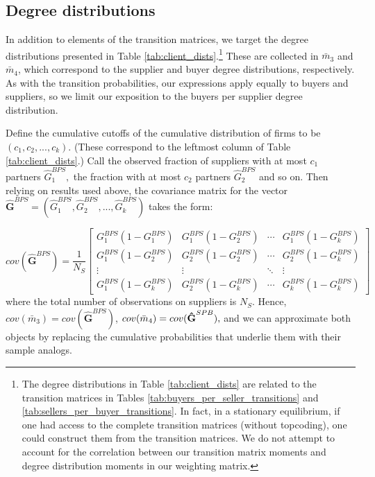 \documentclass[12pt]{article} \usepackage{amsmath,amssymb,amsthm,geometry,graphicx,setspace,algorithm,algpseudocode,float}
\begin{document}
\subsection{Degree distributions}

In addition to elements of the transition matrices, we target the degree
distributions presented in Table \ref{tab:client_dists}.\footnote{%
The degree distributions in Table \ref{tab:client_dists} are related to the
transition matrices in Tables \ref{tab:buyers_per_seller_transitions} and %
\ref{tab:sellers_per_buyer_transitions}. In fact, in a stationary
equilibrium, if one had access to the complete transition matrices (without
topcoding), one could construct them from the transition matrices. We do not
attempt to account for the correlation between our transition matrix moments
and degree distribution moments in our weighting matrix.} These are
collected in $\bar{m}_{3}$ and $\bar{m}_{4}$, which correspond to the supplier
and buyer degree distributions, respectively. As with the transition
probabilities, our expressions apply equally to buyers and suppliers, so we
limit our exposition to the buyers per supplier degree distribution.

Define the cumulative cutoffs of the cumulative distribution of firms to be $%
\left( c_{1},c_{2},...,c_{k}\right) .$ (These correspond to the leftmost
column of Table \ref{tab:client_dists}.) Call the observed fraction of
suppliers with at most $c_{1}$ partners $\hat{G}_{1}^{BPS},$ the fraction
with at most $c_{2}$ partners $\hat{G}_{2}^{BPS}$ and so on. Then relying on
results used above, the covariance matrix for the vector $\mathbf{\hat{G}}%
^{BPS}=\left( \hat{G}_{1}^{BPS},\hat{G}_{2}^{BPS},...,\hat{G}%
_{k}^{BPS}\right) $ takes the form:

\begin{equation}
cov(\mathbf{\hat{G}}^{BPS})=\frac{1}{N_{S}}\left[ 
\begin{array}{cccc}
G_{1}^{BPS}(1-G_{1}^{BPS}) & G_{1}^{BPS}(1-G_{2}^{BPS}) & \cdots  & 
G_{1}^{BPS}(1-G_{k}^{BPS}) \\ 
G_{1}^{BPS}(1-G_{2}^{BPS}) & G_{2}^{BPS}(1-G_{2}^{BPS}) & \cdots  & 
G_{2}^{BPS}(1-G_{k}^{BPS}) \\ 
\vdots  & \vdots  & \ddots  & \vdots  \\ 
G_{1}^{BPS}(1-G_{k}^{BPS}) & G_{2}^{BPS}(1-G_{k}^{BPS}) & \cdots  & 
G_{k}^{BPS}(1-G_{k}^{BPS})%
\end{array}%
\right]   \label{cov_DS}
\end{equation}
where the total number of observations on suppliers is $N_{S}$. Hence,  $cov(%
\bar{m}_{3})=cov(\mathbf{\hat{G}}^{BPS})$, $cov(\bar{m}_{4})=cov(\mathbf{%
\hat{G}}^{SPB}),$ and we can approximate both objects by replacing the
cumulative probabilities that underlie them with their sample analogs.
\end{document}
